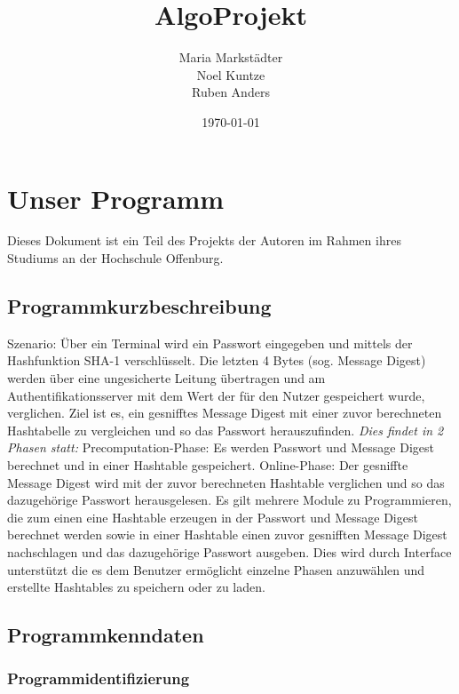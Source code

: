 \documentclass[11pt]{article}
\title{\textbf{AlgoProjekt}}
\author{Maria Markstädter\\
                Noel Kuntze\\
                Ruben Anders\\}
\date{\today}
\begin{document}
 

\maketitle
\newpage
\tableofcontents
\newpage
  \section{Unser Programm}
Dieses Dokument ist ein Teil des Projekts der Autoren im Rahmen ihres Studiums an der Hochschule Offenburg.
  \subsection{Programmkurzbeschreibung}
  Szenario:
Über ein Terminal wird ein Passwort eingegeben und  mittels der Hashfunktion SHA-1 verschlüsselt. Die letzten 4 Bytes (sog. Message Digest) werden über eine ungesicherte Leitung übertragen und am Authentifikationsserver mit dem Wert der für den Nutzer gespeichert wurde, verglichen. \newline 
Ziel ist es, ein gesnifftes Message Digest mit einer zuvor berechneten Hashtabelle zu vergleichen und so das Passwort herauszufinden.\vspace{2px}   \newline 
{\itshape{Dies findet in 2 Phasen statt:}} \vspace{2px}   \newline
Precomputation-Phase: Es werden Passwort und Message Digest berechnet und in einer Hashtable gespeichert.\vspace{2px} \newline 
Online-Phase: Der gesniffte Message Digest wird mit der zuvor berechneten Hashtable verglichen und so das dazugehörige Passwort herausgelesen. 
Es gilt mehrere Module zu Programmieren, die zum einen eine Hashtable erzeugen in der Passwort und Message Digest berechnet werden sowie in einer Hashtable einen zuvor gesnifften Message Digest nachschlagen und das dazugehörige Passwort ausgeben. Dies wird durch Interface unterstützt die es dem Benutzer ermöglicht einzelne Phasen anzuwählen und erstellte Hashtables zu speichern oder zu laden.

  \subsection{Programmkenndaten}
  \subsubsection{Programmidentifizierung}
\end{document}
